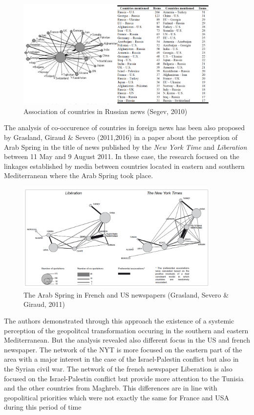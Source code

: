 \documentclass[
]{article}
\begin{document}
\begin{figure}
\centering
\includegraphics[width=0.9\textwidth,height=\textheight]{img/Segev2010a.png}
\caption{Association of countries in Russian news (Segev, 2010)}
\end{figure}

The analysis of co-occurence of countries in foreign news has been also
proposed by Grasland, Giraud \& Severo (2011,2016) in a paper about the
perception of Arab Spring in the title of news published by the
\emph{New York Time} and \emph{Liberation} between 11 May and 9 August
2011. In these case, the research focused on the linkages established by
media between countries located in eastern and southern Mediterranean
where the Arab Spring took place.

\begin{figure}
\centering
\includegraphics[width=0.9\textwidth,height=\textheight]{img/grasland_giraud_severo_2011.png}
\caption{The Arab Spring in French and US newspapers (Grasland, Severo
\& Giraud, 2011)}
\end{figure}

The authors demonstrated through this approach the existence of a
systemic perception of the geopolitcal transformation occuring in the
southern and eastern Mediterranean. But the analysis revealed also
different focus in the US and french newspaper. The network of the NYT
is more focused on the eastern part of the area with a major interest in
the case of the Israel-Palestin conflict but also in the Syrian civil
war. The network of the french newspaper Liberation is also focused on
the Israel-Palestin conflict but provide more attention to the Tunisia
and the other countries from Maghreb. This differences are in line with
geopolitical priorities which were not exactly the same for France and
USA during this period of time
\end{document}
